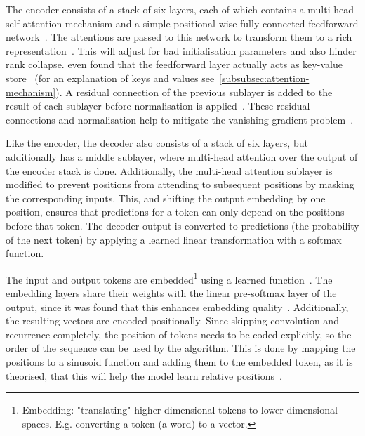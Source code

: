 The encoder consists of a stack of six layers, each of which contains a multi-head self-attention mechanism and a simple positional-wise fully connected feedforward network~\autocite{Vaswani2017}.
The attentions are passed to this network to transform them to a rich representation~\autocite{Vaswani2017}.
This will adjust for bad initialisation parameters and also hinder rank collapse. %
\citeauthor{Geva2021} even found that the feedforward layer actually acts as key-value store~\autocite{Geva2021} (for an explanation of keys and values see~\autoref{subsubsec:attention-mechanism}).
A residual connection of the previous sublayer is added to the result of each sublayer before normalisation is applied~\autocite{Vaswani2017}.
These residual connections and normalisation help to mitigate the vanishing gradient problem~\autocite{Wang2019}. %

Like the encoder, the decoder also consists of a stack of six layers, but additionally has a middle sublayer, where multi-head attention over the output of the encoder stack is done.
Additionally, the multi-head attention sublayer is modified to prevent positions from attending to subsequent positions by masking the corresponding inputs.
This, and shifting the output embedding by one position, ensures that predictions for a token can only depend on the positions before that token.
The decoder output is converted to predictions (the probability of the next token) by applying a learned linear transformation with a softmax function.~\autocite{Vaswani2017}

The input and output tokens are embedded\footnote{Embedding: "translating" higher dimensional tokens to lower dimensional spaces. E.g. converting a token (a word) to a vector.} using a learned function~\autocite{Vaswani2017}.
The embedding layers share their weights with the linear pre-softmax layer of the output, since it was found that this enhances embedding quality~\autocite{Press2017}.
Additionally, the resulting vectors are encoded positionally.
Since skipping convolution and recurrence completely, the position of tokens needs to be coded explicitly, so the order of the sequence can be used by the algorithm.
This is done by mapping the positions to a sinusoid function and adding them to the embedded token, as it is theorised, that this will help the model learn relative positions~\autocite{Vaswani2017}.

